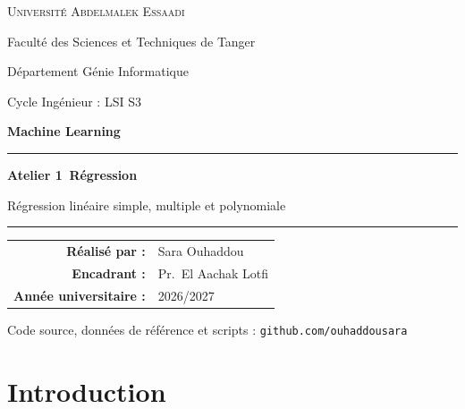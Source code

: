 \documentclass[11pt,a4paper]{report}
\newcommand{\AuteurRapport}{Sara Ouhaddou}
\newcommand{\AnneeUniv}{2026/2027}
\begin{document}
\begin{titlepage}
  \centering
  {\large \textsc{Universit\'e Abdelmalek Essaadi}\par}
  {\large Facult\'e des Sciences et Techniques de Tanger\par}
  {\large D\'epartement G\'enie Informatique\par}
  \vspace{0.6cm}
  {\large Cycle Ing\'enieur : LSI S3\par}
  \vspace{2.2cm}
  {\Large \textbf{Machine Learning}\par}
  \vspace{0.8cm}
  \rule{\linewidth}{0.6pt}\par\vspace{0.5cm}
  {\Huge \textbf{Atelier 1 \guillemotleft{}\,R\'egression\,\guillemotright}\par}
  \vspace{0.4cm}
  {\large R\'egression lin\'eaire simple, multiple et polynomiale\par}
  \vspace{0.3cm}\rule{\linewidth}{0.6pt}\par
  \vspace{2.5cm}
  \begin{tabular}{rl}
    \textbf{R\'ealis\'e par :} & \AuteurRapport \\[0.4em]
    \textbf{Encadrant :} & Pr.\ El Aachak Lotfi \\[0.4em]
    \textbf{Ann\'ee universitaire :} & \AnneeUniv
  \end{tabular}
  \vfill
  {\small Code source, donn\'ees de r\'ef\'erence et scripts :
   \texttt{github.com/ouhaddousara}\par}
\end{titlepage}

\tableofcontents
\clearpage
\listoffigures
\clearpage
\listoftables
\clearpage
{}

\chapter*{Introduction}
\end{document}
